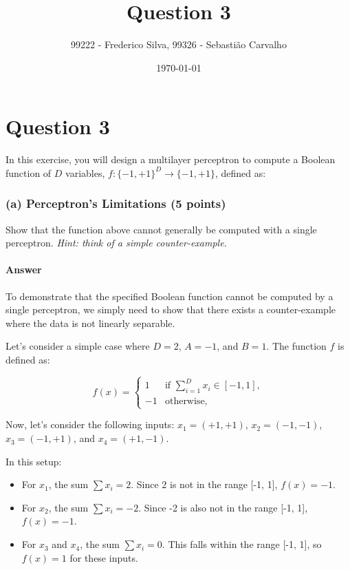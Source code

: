 \documentclass{article}
\title{Question 3}
\author{99222 - Frederico Silva, 99326 - Sebastião Carvalho}
\date{\today}
\begin{document}
\maketitle

\section*{Question 3}
In this exercise, you will design a multilayer perceptron to compute a Boolean function of \( D \) variables, \(f : \{-1,+1\}^D \rightarrow \{-1,+1\} \), defined as:

\subsubsection*{(a) Perceptron's Limitations (5 points)}

Show that the function above cannot generally be computed with a single perceptron. \textit{Hint: think of a simple counter-example.}

\paragraph{Answer}

To demonstrate that the specified Boolean function cannot be computed by a single perceptron, we simply need to show
that there exists a counter-example where the data is not linearly separable.

Let's consider a simple case where \( D = 2 \), \( A = -1 \), and \( B = 1 \). The function \( f \) is defined as:

\[
    f(x) =
    \begin{cases}
        1  & \text{if } \sum_{i=1}^{D} x_i \in [-1, 1], \\
        -1 & \text{otherwise},
    \end{cases}
\]

Now, let's consider the following inputs:
\(x_1 = (+1, +1)\), \(x_2 = (-1, -1)\), \(x_3 = (-1, +1)\), and \(x_4 = (+1, -1)\).

In this setup:

\begin{itemize}
    \item For \( x_1 \), the sum \( \sum x_i = 2 \). Since 2 is not in the range [-1, 1], \( f(x) = -1 \).
    \item For \( x_2 \), the sum \( \sum x_i = -2 \). Since -2 is also not in the range [-1, 1], \( f(x) = -1 \).
    \item For \( x_3 \) and \( x_4 \), the sum \( \sum x_i = 0 \). This falls within the range [-1, 1], so \( f(x) = 1 \) for these inputs.
\end{itemize}
\end{document}
